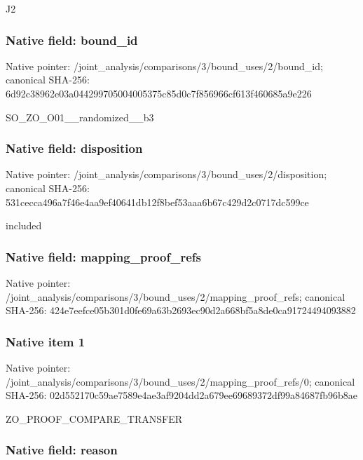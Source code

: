 \documentclass[10pt,a4paper]{article}
\begin{document}
J2


\subsubsection{Native field: bound\_id}


Native pointer: /joint\_analysis/comparis\allowbreak{}ons/3/bound\_uses/2/bound\allowbreak{}\_id; canonical SHA-256: 6d92c38962e03a0442997050\allowbreak{}04005375c85d0c7f856966cf\allowbreak{}613f460685a9e226


SO\_ZO\_O01\_\_randomized\_\_b3


\subsubsection{Native field: disposition}


Native pointer: /joint\_analysis/comparis\allowbreak{}ons/3/bound\_uses/2/dispo\allowbreak{}sition; canonical SHA-256: 531cecca496a7f46e4aa9ef4\allowbreak{}0641db12f8bef53aaa6b67c4\allowbreak{}29d2c0717dc599ce


included


\subsubsection{Native field: mapping\_proof\_refs}


Native pointer: /joint\_analysis/comparis\allowbreak{}ons/3/bound\_uses/2/mappi\allowbreak{}ng\_proof\_refs; canonical SHA-256: 424e7eefce05b301d0fe69a6\allowbreak{}3b2693ec90d2a668bf5a8de0\allowbreak{}ca91724494093882



\subsubsection{Native item 1}


Native pointer: /joint\_analysis/comparis\allowbreak{}ons/3/bound\_uses/2/mappi\allowbreak{}ng\_proof\_refs/0; canonical SHA-256: 02d552170c59ae7589e4ae3a\allowbreak{}f9204dd2a679ee69689372df\allowbreak{}99a84687fb96b8ae


ZO\_PROOF\_COMPARE\_TRANSFER


\subsubsection{Native field: reason}
\end{document}
